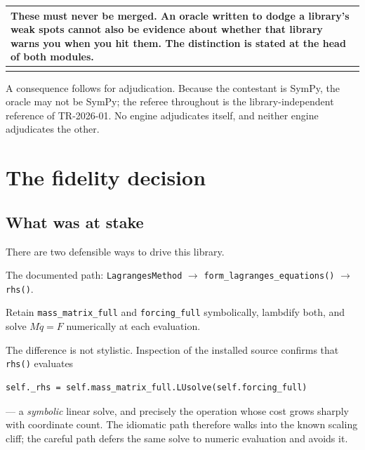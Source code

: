 \documentclass[11pt,a4paper]{article}
\makeatletter
\newenvironment{callout}
  {\par\medskip\noindent\begin{tabular}{@{}p{0.94\textwidth}@{}}
   \arrayrulecolor{warnrule}\hline\rule{0pt}{2.6ex}}
  {\\[0.8ex]\hline\arrayrulecolor{black}\end{tabular}\par\medskip}
\makeatother
\begin{document}
\begin{callout}
These must never be merged. An oracle written to dodge a library's weak spots
cannot also be evidence about whether that library warns you when you hit them.
The distinction is stated at the head of both modules.
\end{callout}

\noindent A consequence follows for adjudication. Because the contestant is
SymPy, the oracle may not be SymPy; the referee throughout is the
library-independent reference of TR-2026-01. No engine adjudicates itself, and
neither engine adjudicates the other.

\section{The fidelity decision}

\subsection{What was at stake}

There are two defensible ways to drive this library.

\begin{description}[leftmargin=1.6em,style=nextline,itemsep=0.35em]
\item[\normalfont\texttt{idiomatic}] The documented path:
  \texttt{LagrangesMethod} $\rightarrow$
  \texttt{form\_lagranges\_equations()} $\rightarrow$ \texttt{rhs()}.
\item[\normalfont\texttt{careful}] Retain \texttt{mass\_matrix\_full} and
  \texttt{forcing\_full} symbolically, lambdify both, and solve
  $M\ddot q = F$ numerically at each evaluation.
\end{description}

\noindent The difference is not stylistic. Inspection of the installed source
confirms that \texttt{rhs()} evaluates

\begin{lstlisting}
self._rhs = self.mass_matrix_full.LUsolve(self.forcing_full)
\end{lstlisting}

\noindent --- a \emph{symbolic} linear solve, and precisely the operation whose
cost grows sharply with coordinate count. The idiomatic path therefore walks
into the known scaling cliff; the careful path defers the same solve to numeric
evaluation and avoids it.
\end{document}
